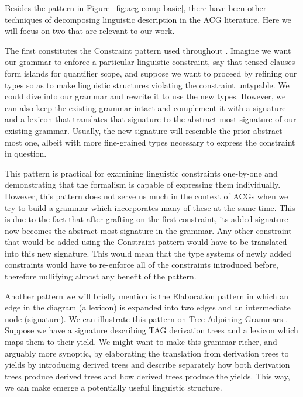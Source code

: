 \documentclass{llncs}
\begin{document}
Besides the pattern in Figure~\ref{fig:acg-comp-basic}, there have been other
techniques of decomposing linguistic description in the ACG literature. Here
we will focus on two that are relevant to our work.

The first constitutes the Constraint pattern used throughout
\cite{pogodalla2012controlling}. Imagine we want our grammar to enforce a
particular linguistic constraint, say that tensed clauses form islands for
quantifier scope, and suppose we want to proceed by refining our types so as
to make linguistic structures violating the constraint untypable. We could
dive into our grammar and rewrite it to use the new types. However, we can
also keep the existing grammar intact and complement it with a signature and a
lexicon that translates that signature to the abstract-most signature of our
existing grammar. Usually, the new signature will resemble the prior
abstract-most one, albeit with more fine-grained types necessary to express
the constraint in question.

This pattern is practical for examining linguistic constraints one-by-one and
demonstrating that the formalism is capable of expressing them
individually. However, this pattern does not serve us much in the context of
ACGs when we try to build a grammar which incorporates many of these at the
same time. This is due to the fact that after grafting on the first
constraint, its added signature now becomes the abstract-most signature in the
grammar. Any other constraint that would be added using the Constraint pattern
would have to be translated into this new signature. This would mean that the
type systems of newly added constraints would have to re-enforce all of the
constraints introduced before, therefore nullifying almost any benefit of the
pattern.

Another pattern we will briefly mention is the Elaboration pattern in which an
edge in the diagram (a lexicon) is expanded into two edges and an intermediate
node (signature). We can illustrate this pattern on Tree Adjoining Grammars
\cite{degroote02}. Suppose we have a signature describing TAG derivation trees
and a lexicon which maps them to their yield. We might want to make this
grammar richer, and arguably more synoptic, by elaborating the translation
from derivation trees to yields by introducing derived trees and describe
separately how both derivation trees produce derived trees and how derived
trees produce the yields. This way, we can make emerge a potentially useful
linguistic structure.
\end{document}
